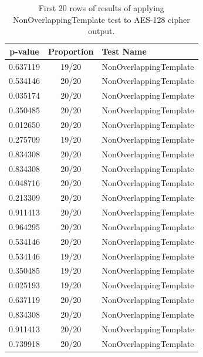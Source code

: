 \documentclass[conference]{IEEEtran}
\begin{document}
\begin{center}
\begin{table}[H]
\renewcommand{\arraystretch}{1.2}
\centering
\begin{tabular}{|c|c|l|}
\hline
\textbf{p-value} & \textbf{Proportion} & \textbf{Test Name} \\ \hline
0.637119         & 19/20               & NonOverlappingTemplate    \\ \hline
0.534146         & 20/20               & NonOverlappingTemplate    \\ \hline
0.035174         & 20/20               & NonOverlappingTemplate    \\ \hline
0.350485         & 20/20               & NonOverlappingTemplate    \\ \hline
0.012650         & 20/20               & NonOverlappingTemplate    \\ \hline
0.275709         & 19/20               & NonOverlappingTemplate    \\ \hline
0.834308         & 20/20               & NonOverlappingTemplate    \\ \hline
0.834308         & 20/20               & NonOverlappingTemplate    \\ \hline
0.048716         & 20/20               & NonOverlappingTemplate    \\ \hline
0.213309         & 20/20               & NonOverlappingTemplate    \\ \hline
0.911413         & 20/20               & NonOverlappingTemplate    \\ \hline
0.964295         & 20/20               & NonOverlappingTemplate    \\ \hline
0.534146         & 20/20               & NonOverlappingTemplate    \\ \hline
0.534146         & 19/20               & NonOverlappingTemplate    \\ \hline
0.350485         & 19/20               & NonOverlappingTemplate    \\ \hline
0.025193         & 19/20               & NonOverlappingTemplate    \\ \hline
0.637119         & 20/20               & NonOverlappingTemplate    \\ \hline
0.834308         & 20/20               & NonOverlappingTemplate    \\ \hline
0.911413         & 20/20               & NonOverlappingTemplate    \\ \hline
0.739918         & 20/20               & NonOverlappingTemplate    \\ \hline
\end{tabular}
\caption{First 20 rows of results of applying NonOverlappingTemplate test to AES-128 cipher output.}
\label{nistresults1}
\end{table}
\end{center}
\end{document}
